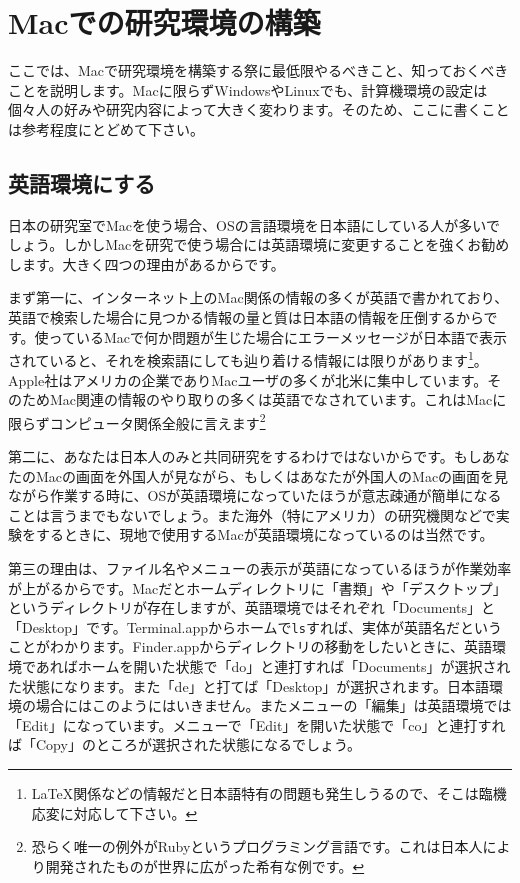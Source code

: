 \setcounter{chapter}{0}
\renewcommand{\thechapter}{\Alph{chapter}}
\setcounter{equation}{0}
\renewcommand{\theequation}{\Alph{chapter}.\arabic{equation}}
\setcounter{figure}{0}
\renewcommand{\thefigure}{\Alph{chapter}.\arabic{figure}}
\setcounter{table}{0}
\renewcommand{\thetable}{\Alph{chapter}.\arabic{table}}
\appendix
\chapter{Macでの研究環境の構築}
ここでは、Macで研究環境を構築する祭に最低限やるべきこと、知っておくべきことを説明します。Macに限らずWindowsやLinuxでも、計算機環境の設定は個々人の好みや研究内容によって大きく変わります。そのため、ここに書くことは参考程度にとどめて下さい。
\section{英語環境にする}
日本の研究室でMacを使う場合、OSの言語環境を日本語にしている人が多いでしょう。しかしMacを研究で使う場合には英語環境に変更することを強くお勧めします。大きく四つの理由があるからです。

まず第一に、インターネット上のMac関係の情報の多くが英語で書かれており、英語で検索した場合に見つかる情報の量と質は日本語の情報を圧倒するからです。使っているMacで何か問題が生じた場合にエラーメッセージが日本語で表示されていると、それを検索語にしても辿り着ける情報には限りがあります\footnote{\LaTeX 関係などの情報だと日本語特有の問題も発生しうるので、そこは臨機応変に対応して下さい。}。Apple社はアメリカの企業でありMacユーザの多くが北米に集中しています。そのためMac関連の情報のやり取りの多くは英語でなされています。これはMacに限らずコンピュータ関係全般に言えます\footnote{恐らく唯一の例外がRubyというプログラミング言語です。これは日本人により開発されたものが世界に広がった希有な例です。}

第二に、あなたは日本人のみと共同研究をするわけではないからです。もしあなたのMacの画面を外国人が見ながら、もしくはあなたが外国人のMacの画面を見ながら作業する時に、OSが英語環境になっていたほうが意志疎通が簡単になることは言うまでもないでしょう。また海外（特にアメリカ）の研究機関などで実験をするときに、現地で使用するMacが英語環境になっているのは当然です。

第三の理由は、ファイル名やメニューの表示が英語になっているほうが作業効率が上がるからです。Macだとホームディレクトリに「書類」や「デスクトップ」というディレクトリが存在しますが、英語環境ではそれぞれ「Documents」と「Desktop」です。Terminal.appからホームで\texttt{ls}すれば、実体が英語名だということがわかります。Finder.appからディレクトリの移動をしたいときに、英語環境であればホームを開いた状態で「do」と連打すれば「Documents」が選択された状態になります。また「de」と打てば「Desktop」が選択されます。日本語環境の場合にはこのようにはいきません。またメニューの「編集」は英語環境では「Edit」になっています。メニューで「Edit」を開いた状態で「co」と連打すれば「Copy」のところが選択された状態になるでしょう。

